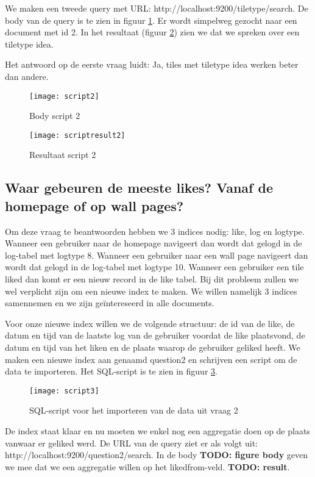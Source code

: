 We maken een tweede query met URL: http://localhost:9200/tiletype/\textunderscore search. De body van de query is te zien in figuur \ref{fig:script2}. Er wordt simpelweg gezocht naar een document met id 2. In het resultaat (figuur \ref{fig:scriptresult2}) zien we dat we spreken over een tiletype idea.

Het antwoord op de eerste vraag luidt: Ja, tiles met tiletype idea werken beter dan andere.

\begin{figure}
	\centering
	\texttt{[image: script2]}
	\caption{Body script 2}
	\label{fig:script2}
\end{figure}

\begin{figure}
	\centering
	\texttt{[image: scriptresult2]}
	\caption{Resultaat script 2}
	\label{fig:scriptresult2}
\end{figure}

\subsection{Waar gebeuren de meeste likes? Vanaf de homepage of op wall pages?}
Om deze vraag te beantwoorden hebben we 3 indices nodig: like, log en logtype. Wanneer een gebruiker naar de homepage navigeert dan wordt dat gelogd in de log-tabel met logtype 8. Wanneer een gebruiker naar een wall page navigeert dan wordt dat gelogd in de log-tabel met logtype 10. Wanneer een gebruiker een tile liked dan komt er een nieuw record in de like tabel. Bij dit probleem zullen we wel verplicht zijn om een nieuwe index te maken. We willen namelijk 3 indices samennemen en we zijn geïntereseerd in alle documents.

Voor onze nieuwe index willen we de volgende structuur: de id van de like, de datum en tijd van de laatste log van de gebruiker voordat de like plaatsvond, de datum en tijd van het liken en de plaats waarop de gebruiker geliked heeft. We maken een nieuwe index aan genaamd question2 en schrijven een script om de data te importeren. Het SQL-script is te zien in figuur \ref{fig:script3}.

\begin{figure}
	\centering
	\texttt{[image: script3]}
	\caption{SQL-script voor het importeren van de data uit vraag 2}
	\label{fig:script3}
\end{figure}

De index staat klaar en nu moeten we enkel nog een aggregatie doen op de plaats vanwaar er geliked werd. De URL van de query ziet er als volgt uit: http://localhost:9200/question2/\textunderscore search. In de body \textbf{TODO: figure body} geven we mee dat we een aggregatie willen op het liked\textunderscore from-veld. \textbf{TODO: result}.

